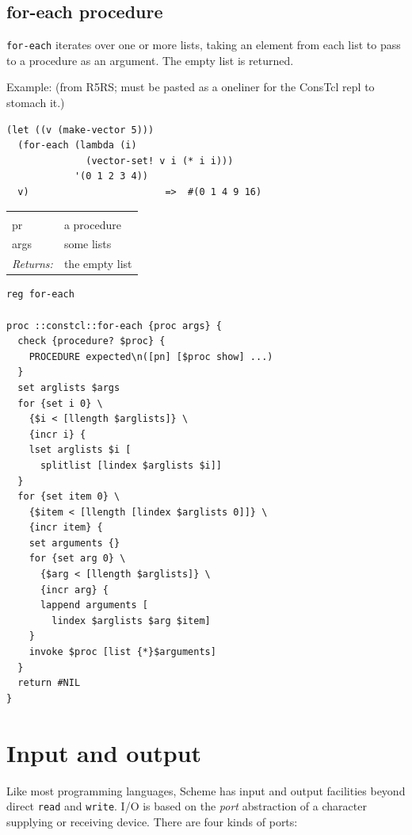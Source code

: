 \documentclass[twoside,9pt]{report}
\begin{document}
\subsection{for-each procedure}
\label{for-each-procedure}


\texttt{for-each} iterates over one or more lists, taking an element from each list to pass to a procedure as an argument. The empty list is returned.



Example: (from R5RS; must be pasted as a oneliner for the ConsTcl repl to stomach it.)

\begin{verbatim}
(let ((v (make-vector 5)))
  (for-each (lambda (i)
              (vector-set! v i (* i i)))
            '(0 1 2 3 4))
  v)                        =>  #(0 1 4 9 16)
\end{verbatim}
\noindent\begin{tabular}{ |p{1.9cm} p{8cm}| }
\hline
\rowcolor[HTML]{CCCCCC} \multicolumn{2}{|l|}{\bf for-each (public)} \\
pr & a procedure \\
args & some lists \\
\textit{Returns:} & the empty list \\
\hline
\end{tabular}
\begin{lstlisting}
reg for-each

proc ::constcl::for-each {proc args} {
  check {procedure? $proc} {
    PROCEDURE expected\n([pn] [$proc show] ...)
  }
  set arglists $args
  for {set i 0} \
    {$i < [llength $arglists]} \
    {incr i} {
    lset arglists $i [
      splitlist [lindex $arglists $i]]
  }
  for {set item 0} \
    {$item < [llength [lindex $arglists 0]]} \
    {incr item} {
    set arguments {}
    for {set arg 0} \
      {$arg < [llength $arglists]} \
      {incr arg} {
      lappend arguments [
        lindex $arglists $arg $item]
    }
    invoke $proc [list {*}$arguments]
  }
  return #NIL
}
\end{lstlisting}
\section{Input and output}
\label{input-and-output}


Like most programming languages, Scheme has input and output facilities beyond direct \texttt{read} and \texttt{write}. I/O is based on the \emph{port} abstraction of a character supplying or receiving device. There are four kinds of ports:
\end{document}
